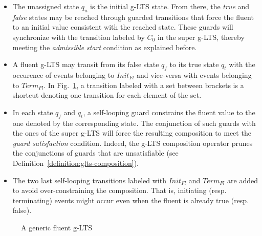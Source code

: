 \begin{itemize}
\item The unassigned state $q_u$ is the initial g-LTS state. From there, the \emph{true} and \emph{false} states may be reached through guarded transitions that force the fluent to an initial value consistent with the reached state. These guards will synchronize with the transition labeled by $C_0$ in the super g-LTS, thereby meeting the \emph{admissible start} condition as explained before.
\item A fluent g-LTS may transit from its false state $q_f$ to its true state $q_t$ with the occurence of events belonging to $Init_{Fl}$ and vice-versa with events belonging to $Term_{Fl}$. In Fig.~\ref{image:fluent-glts}, a transition labeled with a set between brackets is a shortcut denoting one transition for each element of the set.
\item In each state $q_f$ and $q_t$, a self-looping guard constrains the fluent value to the one denoted by the corresponding state. The conjunction of such guards with the ones of the super g-LTS will force the resulting composition to meet the \emph{guard satisfaction} condition. Indeed, the g-LTS composition operator prunes the conjunctions of guards that are unsatisfiable (see Definition~\ref{definition:glts-composition}).
\item The two last self-looping transitions labeled with $Init_{Fl}$ and $Term_{Fl}$ are added to avoid over-constraining the composition. That is, initiating (resp. terminating) events might occur even when the fluent is already true (resp. false).
\end{itemize}

\begin{figure}\centering
{}
\caption{A generic fluent g-LTS\label{image:fluent-glts}}
\end{figure}

